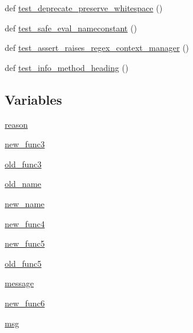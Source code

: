 \begin{DoxyCompactItemize}
\item 
def \hyperlink{namespacenumpy_1_1lib_1_1tests_1_1test__utils_a4bf9fb083c84357a1761e3140a84836f}{test\+\_\+deprecate\+\_\+preserve\+\_\+whitespace} ()
\item 
def \hyperlink{namespacenumpy_1_1lib_1_1tests_1_1test__utils_a825ba40c7ae9bc827185f012bf6cbff1}{test\+\_\+safe\+\_\+eval\+\_\+nameconstant} ()
\item 
def \hyperlink{namespacenumpy_1_1lib_1_1tests_1_1test__utils_afdaef4a317c80f48be074f4d5a684c4e}{test\+\_\+assert\+\_\+raises\+\_\+regex\+\_\+context\+\_\+manager} ()
\item 
def \hyperlink{namespacenumpy_1_1lib_1_1tests_1_1test__utils_af6302e164c575ec8768427e17eed824c}{test\+\_\+info\+\_\+method\+\_\+heading} ()
\end{DoxyCompactItemize}
\subsection*{Variables}
\begin{DoxyCompactItemize}
\item 
\hyperlink{namespacenumpy_1_1lib_1_1tests_1_1test__utils_a20c969aa000ea19ba0560d953a6f5899}{reason}
\item 
\hyperlink{namespacenumpy_1_1lib_1_1tests_1_1test__utils_aa753fde165730f3f4fc1703a441bb3b4}{new\+\_\+func3}
\item 
\hyperlink{namespacenumpy_1_1lib_1_1tests_1_1test__utils_a40f6c217160f2ecc0db1522d00b8d9a6}{old\+\_\+func3}
\item 
\hyperlink{namespacenumpy_1_1lib_1_1tests_1_1test__utils_ace7149ccf6b3bd17b0dcb98d1ae81e59}{old\+\_\+name}
\item 
\hyperlink{namespacenumpy_1_1lib_1_1tests_1_1test__utils_a443ef72c78968154fc92d5d61dcd2439}{new\+\_\+name}
\item 
\hyperlink{namespacenumpy_1_1lib_1_1tests_1_1test__utils_a30f23325e797269c58e7339d2b729612}{new\+\_\+func4}
\item 
\hyperlink{namespacenumpy_1_1lib_1_1tests_1_1test__utils_a8261b393f2afbe4056a1684be9f6d5fb}{new\+\_\+func5}
\item 
\hyperlink{namespacenumpy_1_1lib_1_1tests_1_1test__utils_aba4a7234e41461d449328c7ae75f7062}{old\+\_\+func5}
\item 
\hyperlink{namespacenumpy_1_1lib_1_1tests_1_1test__utils_ace48f70d3b433c0396e43afa67121ef9}{message}
\item 
\hyperlink{namespacenumpy_1_1lib_1_1tests_1_1test__utils_a890541dfa4ce8636547d232dbf42e9c4}{new\+\_\+func6}
\item 
\hyperlink{namespacenumpy_1_1lib_1_1tests_1_1test__utils_a38ec8caa2936ab9032cd4e196d61122c}{msg}
\end{DoxyCompactItemize}


